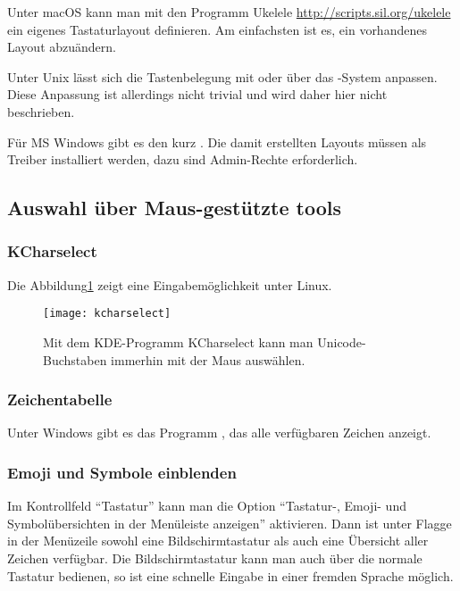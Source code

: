 Unter macOS kann man mit den Programm Ukelele \url{http://scripts.sil.org/ukelele} ein eigenes
Tastaturlayout definieren. Am einfachsten ist es, ein vorhandenes Layout abzuändern.

Unter Unix lässt sich die Tastenbelegung mit  oder über das -System
anpassen. Diese Anpassung ist allerdings nicht trivial und wird daher hier nicht beschrieben.

Für MS Windows gibt es den  kurz .
Die damit erstellten Layouts müssen als Treiber installiert werden, dazu sind Admin-Rechte erforderlich.

\subsection{Auswahl über Maus-gestützte tools}

\subsubsection{KCharselect}

Die Abbildung\ref{fig:kcharselect} zeigt eine Eingabemöglichkeit unter Linux.

\begin{figure}
 \texttt{[image: kcharselect]}
 \caption{Mit dem KDE-Programm KCharselect kann man Unicode-Buchstaben immerhin mit der Maus
 auswählen.}
 \label{fig:kcharselect}
\end{figure}

\subsubsection{Zeichentabelle}

Unter Windows gibt es das Programm , das alle verfügbaren Zeichen anzeigt.

\subsubsection{Emoji und Symbole einblenden}

Im Kontrollfeld \enquote{Tastatur} kann man die Option \enquote{Tastatur-, Emoji- und Symbolübersichten in der Menüleiste anzeigen} aktivieren.
Dann ist unter Flagge in der Menüzeile sowohl eine Bildschirmtastatur als auch eine Übersicht aller Zeichen verfügbar. 
Die Bildschirmtastatur kann man auch über die normale Tastatur bedienen, so ist eine schnelle Eingabe in einer fremden Sprache möglich.

